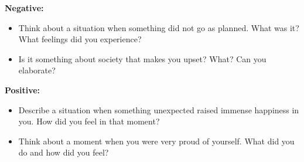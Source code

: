 \textbf{Negative:}
\begin{itemize}
    \item Think about a situation when something did not go as planned. What was it? What feelings did you experience? 
    \item Is it something about society that makes you upset? What? Can you elaborate? 
\end{itemize}
\textbf{Positive: }
\begin{itemize}
    \item Describe a situation when something unexpected raised immense happiness in you. How did you feel in that moment? 
    \item Think about a moment when you were very proud of yourself. What did you do and how did you feel?
\end{itemize}
